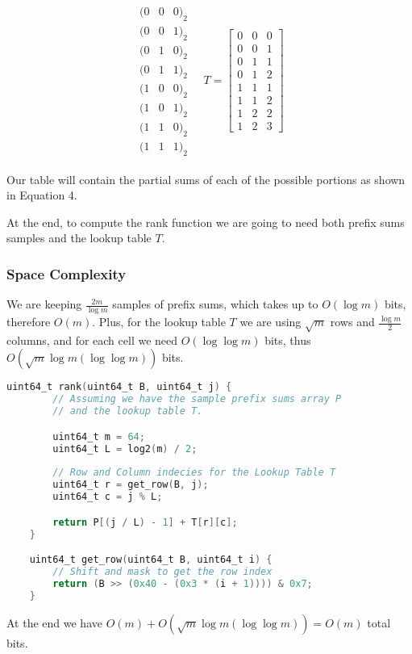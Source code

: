 \documentclass{article}
\begin{document}
\begin{align}
     \begin{matrix}
         (0 & 0 & 0)_2 \\
         (0 & 0 & 1)_2 \\
         (0 & 1 & 0)_2 \\
         (0 & 1 & 1)_2 \\
         (1 & 0 & 0)_2 \\
         (1 & 0 & 1)_2 \\
         (1 & 1 & 0)_2 \\
         (1 & 1 & 1)_2
     \end{matrix} \quad
     T = 
     \begin{bmatrix}
        0 & 0 & 0 \\
        0 & 0 & 1 \\
        0 & 1 & 1 \\
        0 & 1 & 2 \\
        1 & 1 & 1 \\
        1 & 1 & 2 \\
        1 & 2 & 2 \\
        1 & 2 & 3
    \end{bmatrix} 
\end{align}

\noindent Our table will contain the partial sums of each of the possible portions as shown in Equation 4.

\noindent At the end, to compute the rank function we are going to need
both prefix sums samples and the lookup table $T$.

\subsubsection{Space Complexity}

We are keeping $\frac{2m}{\log m}$ samples of prefix sums, which takes up to $O(\log m)$ bits,
therefore $O(m)$.
Plus, for the lookup table $T$ we are using $\sqrt m$ rows and $\frac{\log m}{2}$ columns, and for each cell we
need $O(\log \log m)$ bits, thus $O(\sqrt{m}\log m (\log \log m))$ bits.

\begin{lstlisting}[language=C,caption=`Rank function implemented using a bit array of 64 elements.']
    uint64_t rank(uint64_t B, uint64_t j) {
        // Assuming we have the sample prefix sums array P
        // and the lookup table T.

        uint64_t m = 64; 
        uint64_t L = log2(m) / 2;
        
        // Row and Column indecies for the Lookup Table T
        uint64_t r = get_row(B, j);
        uint64_t c = j % L;

        return P[(j / L) - 1] + T[r][c];
    }

    uint64_t get_row(uint64_t B, uint64_t i) {
        // Shift and mask to get the row index
        return (B >> (0x40 - (0x3 * (i + 1)))) & 0x7;
    }
\end{lstlisting}

\noindent At the end we have $O(m) + O(\sqrt{m}\log m (\log \log m)) = O(m)$ total bits.
\end{document}
